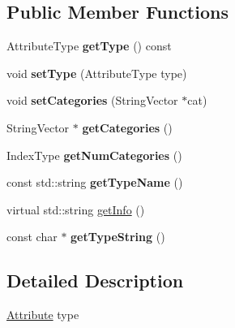 \subsection*{Public Member Functions}
\begin{DoxyCompactItemize}
\item 
\hypertarget{classffactory_1_1_attribute_a4b31d1e0fd0f4136b4f786999779c6bc}{Attribute\-Type {\bfseries get\-Type} () const }\label{classffactory_1_1_attribute_a4b31d1e0fd0f4136b4f786999779c6bc}

\item 
\hypertarget{classffactory_1_1_attribute_a0f55b7b1c41fce2cea4eb836db5ec733}{void {\bfseries set\-Type} (Attribute\-Type type)}\label{classffactory_1_1_attribute_a0f55b7b1c41fce2cea4eb836db5ec733}

\item 
\hypertarget{classffactory_1_1_attribute_a3353b447e5ee893561bc8d7568a854e8}{void {\bfseries set\-Categories} (String\-Vector $\ast$cat)}\label{classffactory_1_1_attribute_a3353b447e5ee893561bc8d7568a854e8}

\item 
\hypertarget{classffactory_1_1_attribute_a319721b6177179fd9a020ce5d17b9b88}{String\-Vector $\ast$ {\bfseries get\-Categories} ()}\label{classffactory_1_1_attribute_a319721b6177179fd9a020ce5d17b9b88}

\item 
\hypertarget{classffactory_1_1_attribute_a6f3cacacd898db9617dc7363585c801f}{Index\-Type {\bfseries get\-Num\-Categories} ()}\label{classffactory_1_1_attribute_a6f3cacacd898db9617dc7363585c801f}

\item 
\hypertarget{classffactory_1_1_attribute_aef23de3a7d441b6cd662fe48d67ab22a}{const std\-::string {\bfseries get\-Type\-Name} ()}\label{classffactory_1_1_attribute_aef23de3a7d441b6cd662fe48d67ab22a}

\item 
virtual std\-::string \hyperlink{classffactory_1_1_attribute_ad5494e94be89e79cefbbc40de865c970}{get\-Info} ()
\item 
\hypertarget{classffactory_1_1_attribute_aff54b418b06e8aa4f4830d88c496ed6b}{const char $\ast$ {\bfseries get\-Type\-String} ()}\label{classffactory_1_1_attribute_aff54b418b06e8aa4f4830d88c496ed6b}

\end{DoxyCompactItemize}


\subsection{Detailed Description}
\hyperlink{classffactory_1_1_attribute}{Attribute} type 

